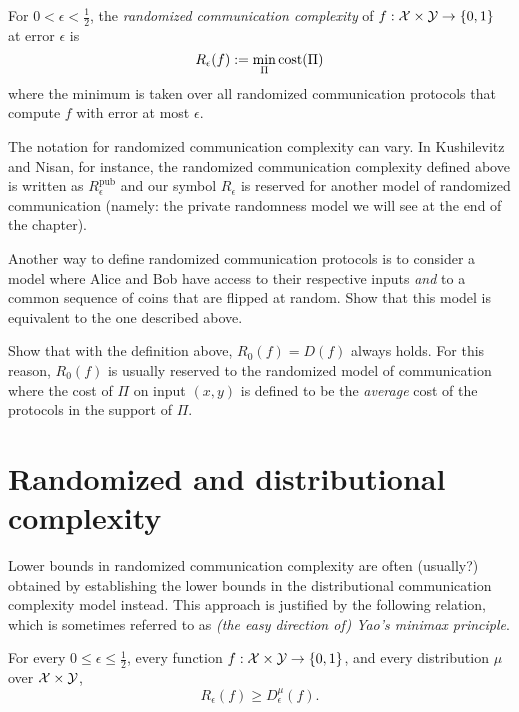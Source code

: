 \begin{definition}
For $0 < \epsilon < \frac12$, the \emph{randomized communication complexity} of $f : \mathcal{X} \times \mathcal{Y} \to \{0,1\}$ at error $\epsilon$ is
\[
R_\epsilon(f) := \min_{\Pi} \mathrm{cost}(\Pi)
\]
where the minimum is taken over all randomized communication protocols that compute $f$ with error at most $\epsilon$.
\end{definition}

\begin{remark}
The notation for randomized communication complexity can vary. In Kushilevitz and Nisan, for instance, the randomized communication complexity defined above is written as $R^{\mathrm{pub}}_\epsilon$ and our symbol $R_\epsilon$ is reserved for another model of randomized communication (namely: the private randomness model we will see at the end of the chapter).
\end{remark}

\exercises

\begin{exercise}
Another way to define randomized communication protocols is to consider a model where Alice and Bob have access to their respective inputs \emph{and} to a common sequence of coins that are flipped at random. Show that this model is equivalent to the one described above.
\end{exercise}

\begin{exercise}
Show that with the definition above, $R_0(f) = D(f)$ always holds. For this reason, $R_0(f)$ is usually reserved to the randomized model of communication where the cost of $\Pi$ on input $(x,y)$ is defined to be the \emph{average} cost of the protocols in the support of $\Pi$.
\end{exercise}


\newpage 
\section{Randomized and distributional complexity}

Lower bounds in randomized communication complexity are often (usually?) obtained by establishing the lower bounds in the distributional communication complexity model instead. This approach is justified by the following relation, which is sometimes referred to as \emph{(the easy direction of) Yao's minimax principle}.

\begin{theorem}
For every $0 \le \epsilon \le \frac12$, every function $f : \mathcal{X} \times \mathcal{Y} \to \{0,1\}$, and every distribution $\mu$ over $\mathcal{X} \times \mathcal{Y}$,
\[
R_\epsilon(f) \ge D_\epsilon^\mu(f).
\]
\end{theorem}

